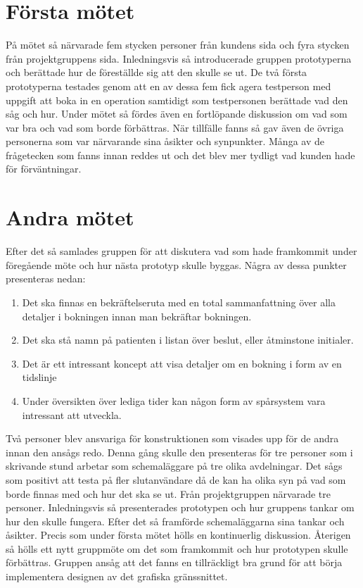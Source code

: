 \section{Första mötet}
På mötet så närvarade fem stycken personer från kundens sida och fyra stycken från projektgruppens sida. Inledningsvis så introducerade gruppen prototyperna och berättade hur de föreställde sig att den skulle se ut.  De två första prototyperna testades genom att en av dessa fem fick agera testperson med uppgift att boka in en operation samtidigt som testpersonen berättade vad den såg och hur. Under mötet så fördes även en fortlöpande diskussion om vad som var bra och vad som borde förbättras. När tillfälle fanns så gav även de övriga personerna som var närvarande sina åsikter och synpunkter. Många av de frågetecken som fanns innan reddes ut och det blev mer tydligt vad kunden hade för förväntningar. 

\section{Andra mötet}
Efter det  så samlades gruppen för att diskutera vad som hade framkommit under föregående möte och hur nästa prototyp skulle byggas. Några av dessa punkter  presenteras nedan:
\begin{enumerate}
	\item Det ska finnas en bekräftelseruta med en total sammanfattning över alla detaljer i bokningen innan man 	 			  	  bekräftar bokningen.
 	\item Det ska stå namn på patienten i listan över beslut, eller åtminstone initialer.
 	\item Det är ett intressant koncept att visa detaljer om en bokning i form av en tidslinje
 	\item Under översikten över lediga tider kan någon form av spårsystem vara intressant att utveckla.
\end{enumerate}
Två personer blev ansvariga för konstruktionen som visades upp för de andra innan den ansågs redo. Denna gång skulle den presenteras för tre personer som i skrivande stund arbetar som schemaläggare på tre olika avdelningar. Det sågs som positivt att testa på fler slutanvändare då de kan ha olika syn på vad som borde finnas med och hur det ska se ut. Från projektgruppen närvarade tre personer. Inledningsvis så presenterades prototypen och hur gruppens tankar om hur den skulle fungera. Efter det så framförde schemaläggarna sina tankar och åsikter. Precis som under första mötet hölls en kontinuerlig diskussion.
Återigen så hölls ett nytt gruppmöte om det som framkommit och hur prototypen skulle förbättras. Gruppen ansåg att det fanns en tillräckligt bra grund för att börja implementera designen av det grafiska gränssnittet.      
  
